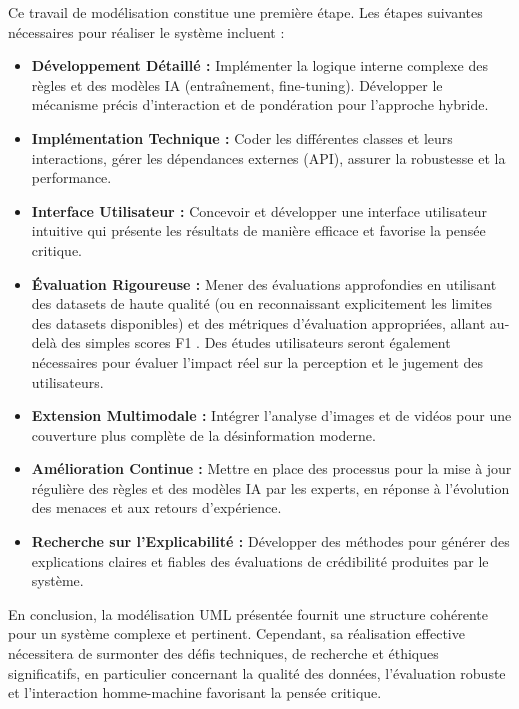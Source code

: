 \documentclass[9pt,twocolumn,french]{article}
\begin{document}
Ce travail de modélisation constitue une première étape. Les étapes suivantes nécessaires pour réaliser le système incluent :
\begin{itemize}
    \item \textbf{Développement Détaillé :} Implémenter la logique interne complexe des règles et des modèles IA (entraînement, fine-tuning). Développer le mécanisme précis d'interaction et de pondération pour l'approche hybride.
    \item \textbf{Implémentation Technique :} Coder les différentes classes et leurs interactions, gérer les dépendances externes (API), assurer la robustesse et la performance.
    \item \textbf{Interface Utilisateur :} Concevoir et développer une interface utilisateur intuitive qui présente les résultats de manière efficace et favorise la pensée critique.
    \item \textbf{Évaluation Rigoureuse :} Mener des évaluations approfondies en utilisant des datasets de haute qualité (ou en reconnaissant explicitement les limites des datasets disponibles) et des métriques d'évaluation appropriées, allant au-delà des simples scores F1 \citep{Thibault2025A}. Des études utilisateurs seront également nécessaires pour évaluer l'impact réel sur la perception et le jugement des utilisateurs.
    \item \textbf{Extension Multimodale :} Intégrer l'analyse d'images et de vidéos pour une couverture plus complète de la désinformation moderne.
    \item \textbf{Amélioration Continue :} Mettre en place des processus pour la mise à jour régulière des règles et des modèles IA par les experts, en réponse à l'évolution des menaces et aux retours d'expérience.
    \item \textbf{Recherche sur l'Explicabilité :} Développer des méthodes pour générer des explications claires et fiables des évaluations de crédibilité produites par le système.
\end{itemize}

En conclusion, la modélisation UML présentée fournit une structure cohérente pour un système complexe et pertinent. Cependant, sa réalisation effective nécessitera de surmonter des défis techniques, de recherche et éthiques significatifs, en particulier concernant la qualité des données, l'évaluation robuste et l'interaction homme-machine favorisant la pensée critique. \\
\nocite{*}

 \\
\tableofcontents 
\end{document}
